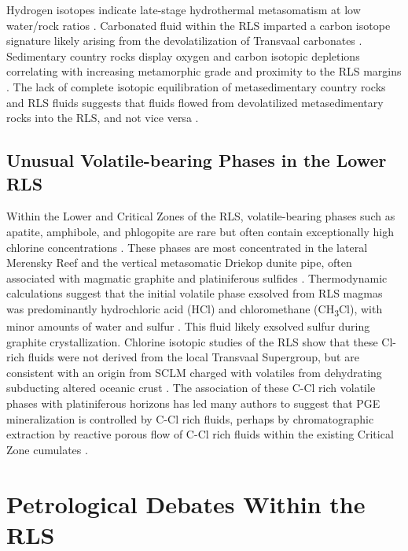 Hydrogen isotopes indicate late-stage hydrothermal metasomatism at low
water/rock ratios \citep{schiffries1990}. Carbonated fluid within
the RLS imparted a carbon isotope signature likely arising from the
devolatilization of Transvaal carbonates \citep{schiffries1990}.
Sedimentary country rocks display oxygen and carbon isotopic depletions
correlating with increasing metamorphic grade and proximity to the RLS
margins \citep{buick2000,schiffries1990}. The lack of
complete isotopic equilibration of metasedimentary country rocks and RLS
fluids suggests that fluids flowed from devolatilized metasedimentary
rocks into the RLS, and not vice versa \citep{buick2000}.

\subsection{Unusual Volatile-bearing Phases in the Lower RLS}
\label{sec:ch5-unusual-volatile-phases-in-the-lower-rls}

Within the Lower and Critical Zones of the RLS, volatile-bearing phases
such as apatite, amphibole, and phlogopite are rare but often contain
exceptionally high chlorine concentrations \citep{boudreau1986,willmore2000}. These phases are most concentrated in the
lateral Merensky Reef and the vertical metasomatic Driekop dunite pipe,
often associated with magmatic graphite and platiniferous sulfides
\citep{ballhaus1985,schiffries1982}. Thermodynamic
calculations suggest that the initial volatile phase exsolved from RLS
magmas was predominantly hydrochloric acid (HCl) and chloromethane
(CH\textsubscript{3}Cl), with minor amounts of water and sulfur \citep{mathez1989}.
This fluid likely exsolved sulfur during graphite crystallization.
Chlorine isotopic studies of the RLS show that these Cl-rich fluids were
not derived from the local Transvaal Supergroup, but are consistent with
an origin from SCLM charged with volatiles from dehydrating subducting
altered oceanic crust \citep{willmore2002}. The association of these
C-Cl rich volatile phases with platiniferous horizons has led many
authors to suggest that PGE mineralization is controlled by C-Cl rich
fluids, perhaps by chromatographic extraction by reactive porous flow of
C-Cl rich fluids within the existing Critical Zone cumulates \citep{boudreau1999}.

\section{Petrological Debates Within the RLS}
\label{sec:ch5-petrological-debates-within-the-rls}

